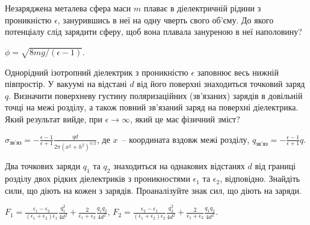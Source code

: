 \begin{problem}
Незаряджена металева сфера маси $m$ плаває в діелектричній рідини з проникністю $\epsilon$, занурившись в неї на одну чверть свого об'єму. До якого потенціалу слід зарядити сферу, щоб вона плавала зануреною в неї наполовину?
\begin{solution}
	$\phi = \sqrt{8mg/(\epsilon-1)}$.
\end{solution}
\end{problem}

\begin{problem}
Однорідний ізотропний діелектрик з проникністю $\epsilon$ заповнює весь нижній півпростір. У вакуумі на відстані $d$ від його поверхні знаходиться точковий заряд $q$. Визначити поверхневу густину поляризаційних (зв'язаних) зарядів в довільній точці на межі розділу, а також повний зв'язаний заряд на поверхні діелектрика. Який результат вийде, при $\epsilon\to\infty$, який це має фізичний зміст?
\begin{solution}
	$\sigma_\text{зв'яз} = - \frac{\epsilon - 1}{\epsilon + 1} \frac{qd}{2\pi(x^2  +h^2)^{3/2}}$, де $x$~-- координата вздовж межі розділу, $q_\text{зв'яз} = - \frac{\epsilon - 1}{\epsilon + 1}q$.
\end{solution}
\end{problem}

\begin{problem}%
Два точкових заряди $q_1$ та $q_2$ знаходиться на однакових відстанях $d$ від границі розділу двох рідких діелектриків з проникностями $\epsilon_1$ та $\epsilon_2$, відповідно. Знайдіть сили, що діють на кожен з зарядів. Проаналізуйте знак сил, що діють на заряди.
\begin{solution}
	$F_1 = \frac{\epsilon_1 - \epsilon_2}{(\epsilon_1 + \epsilon_2)\epsilon_1} \frac{q_1^2}{4d^2} + \frac{2}{\epsilon_1 + \epsilon_2} \frac{q_1q_2}{4d^2}$,
	$F_2 = \frac{\epsilon_2 - \epsilon_1}{(\epsilon_1 + \epsilon_2)\epsilon_2} \frac{q_2^2}{4d^2} + \frac{2}{\epsilon_1 + \epsilon_2} \frac{q_1q_2}{4d^2}$.
\end{solution}
\end{problem}





